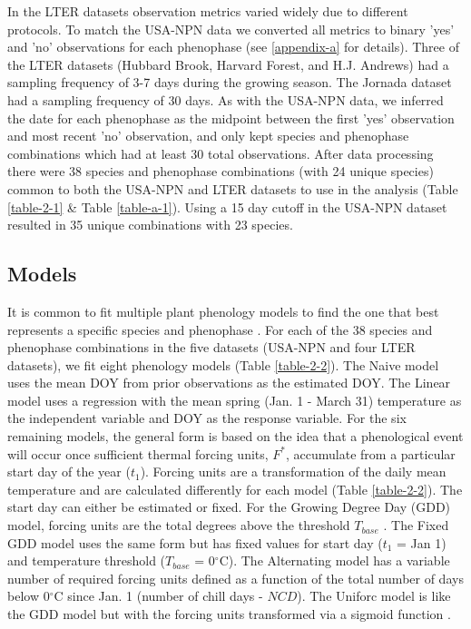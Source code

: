 In the LTER datasets observation metrics varied widely due to different protocols. To match the USA-NPN data we converted all metrics to binary 'yes' and 'no' observations for each phenophase (see \ref{appendix-a} for details). Three of the LTER datasets (Hubbard Brook, Harvard Forest, and H.J. Andrews) had a sampling frequency of 3-7 days during the growing season. The Jornada dataset had a sampling frequency of 30 days. As with the USA-NPN data, we inferred the date for each phenophase as the midpoint between the first 'yes' observation and most recent 'no' observation, and only kept species and phenophase combinations which had at least 30 total observations. After data processing there were 38 species and phenophase combinations (with 24 unique species) common to both the USA-NPN and LTER datasets to use in the analysis (Table \ref{table-2-1} \& Table \ref{table-a-1}). Using a 15 day cutoff in the USA-NPN dataset resulted in 35 unique combinations with 23 species.

\subsection{Models}

It is common to fit multiple plant phenology models to find the one that best represents a specific species and phenophase \citep{chuine2013}. For each of the 38 species and phenophase combinations in the five datasets (USA-NPN and four LTER datasets), we fit eight phenology models (Table \ref{table-2-2}). The Naive model uses the mean DOY from prior observations as the estimated DOY. The Linear model uses a regression with the mean spring (Jan. 1 - March 31) temperature as the independent variable and DOY as the response variable. For the six remaining models, the general form is based on the idea that a phenological event will occur once sufficient thermal forcing units, $F^{*}$, accumulate from a particular start day of the year ($t_{1}$). Forcing units are a transformation of the daily mean temperature and are calculated differently for each model (Table \ref{table-2-2}). The start day can either be estimated or fixed. For the Growing Degree Day (GDD) model, forcing units are the total degrees above the threshold $T_{base}$ \citep{reaumur1735, wang1960, hunter1992}. The Fixed GDD model uses the same form but has fixed values for start day ($t_{1}$ = Jan 1) and temperature threshold ($T_{base}$ = 0$^{\circ}$C). The Alternating model has a variable number of required forcing units defined as a function of the total number of days below 0$^{\circ}$C since Jan. 1 (number of chill days - $NCD$). The Uniforc model is like the GDD model but with the forcing units transformed via a sigmoid function \citep{chuine2000}. 

